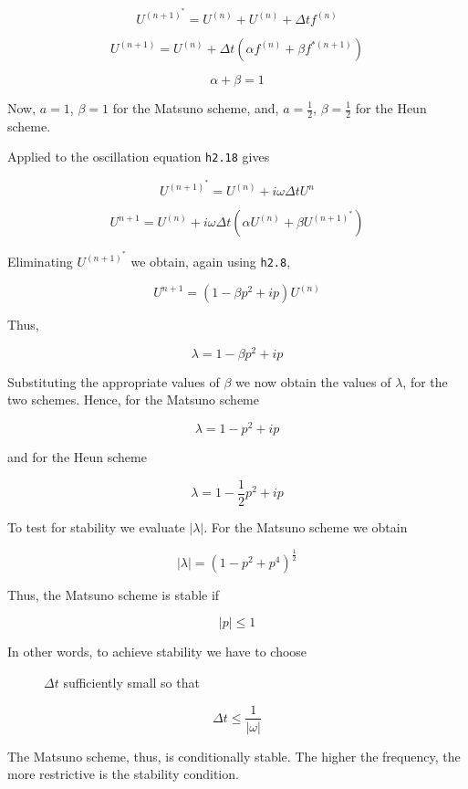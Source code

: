 \[U^{\left( n + 1 \right)^{*}} = U^{\left( n \right)} + U^{\left( n \right)} + \Delta t{ f}^{\left( n \right)}\]

{\[U^{\left( n + 1 \right)} = U^{\left( n \right)} + \Delta t\left( \alpha f^{\left( n \right)} + \beta f^{*\left( n + 1 \right)} \right)\]}

\[\alpha + \beta = 1\]

Now, \(a = 1\), \(\beta = 1\) for the Matsuno scheme, and,
\(a = \frac{1}{2}\), \(\beta = \frac{1}{2}\) for the Heun scheme.

Applied to the oscillation equation \texttt{h2.18} gives

{\[U^{\left( n + 1 \right)^{*}} = U^{\left( n \right)} + i\omega \Delta t U^n\]}

\[U^{n + 1} = U^{\left( n \right)} + i\omega\Delta t\left( \alpha U^{\left( n \right)} + \beta U^{\left( n + 1 \right)^{*}} \right)\]

Eliminating \(U^{\left( n + 1 \right)^{*}}\) we obtain, again using
\texttt{h2.8},

\[U^{n + 1} = \left( 1 - \beta p^{2} + ip \right)U^{\left( n \right)}\]

Thus,

{\[\lambda = 1 - \beta p^{2} + ip\]}

Substituting the appropriate values of \(\beta\) we now obtain the
values of \(\lambda\), for the two schemes. Hence, for the Matsuno
scheme

{\[\lambda = 1 - p^{2} + ip\]}

and for the Heun scheme

{\[\lambda = 1 - \frac{1}{2}p^{2} + i p\]}

To test for stability we evaluate \(| \lambda |\). For the Matsuno
scheme we obtain

{\[| \lambda | = \left( 1 - p^{2} + p^{4} \right)^{\frac{1}{2}}\]}

Thus, the Matsuno scheme is stable if

\[| p | \leq 1\]

\begin{description}
\item[In other words, to achieve stability we have to choose]
\(\Delta t\) sufficiently small so that
\end{description}

{\[\Delta t \leq \frac{1}{| \omega |}\]}

The Matsuno scheme, thus, is conditionally stable. The higher the
frequency, the more restrictive is the stability condition.


